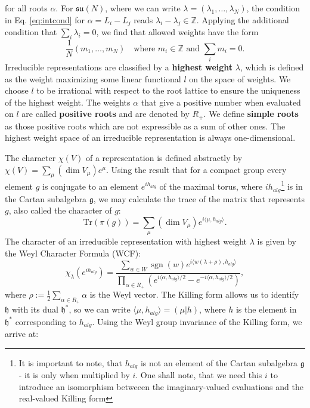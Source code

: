 \documentclass[11pt, a4paper]{article}
\DeclareMathOperator{\sgn}{sgn}
\newcommand{\su}{\mathfrak{su}}
\theoremstyle{definition}
\theoremstyle{remark}
\begin{document}
for all roots $\alpha$. For $\su(N)$, where we can write $\lambda=(\lambda_1, \dots, \lambda_N)$, the condition in Eq. \eqref{eq:intcond} for $\alpha=L_i-L_j$ reads $\lambda_i - \lambda_j \in \mathbb{Z}$. Applying the additional condition that $\sum_i \lambda_i = 0$, we find that allowed weights have the form
\[
\frac{1}{N}(m_1, \dots, m_N) \quad \text{where } m_i \in \mathbb{Z} \text{ and } \sum_i m_i = 0.
\]
Irreducible representations are classified by a \textbf{highest weight} $\lambda$, which is defined as the weight maximizing some linear functional $l$ on the space of weights. We choose $l$ to be irrational with respect to the root lattice to ensure the uniqueness of the highest weight. The weights $\alpha$ that give a positive number when evaluated on $l$ are called \textbf{positive roots} and are denoted by $R_+$. We define \textbf{simple roots} as those positive roots which are not expressible as a sum of other ones. The highest weight space of an irreducible representation is always one-dimensional.

The character $\chi(V)$ of a representation is defined abstractly by $\chi(V) = \sum_\mu (\dim V_\mu)e^\mu$. Using the result that for a compact group every element $g$ is conjugate to an element $e^{ih_{alg}}$ of the maximal torus, where $i h_{alg}$\footnote{It is important to note, that $h_{alg}$ is not an element of the Cartan subalgebra $\mathfrak{g}$ - it is only when multiplied by $i$. One shall note, that we need this $i$ to introduce an isomorphism betweeen the imaginary-valued evaluations and the real-valued Killing form} is in the Cartan subalgebra $\mathfrak{g}$, we may calculate the trace of the matrix that represents $g$, also called the character of $g$:
\[
\mathrm{Tr}(\pi(g)) = \sum_\mu (\dim V_\mu)e^{i\langle \mu, h_{alg} \rangle}.
\]
The character of an irreducible representation with highest weight $\lambda$ is given by the Weyl Character Formula (WCF):
\begin{equation}
    \chi_\lambda(e^{ih_{alg}}) = \frac{\sum_{w \in W} \sgn(w) e^{i\langle w(\lambda + \rho),h_{alg} \rangle}}{\prod_{\alpha \in R_+} (e^{i\langle\alpha,h_{alg}\rangle/2} - e^{-i\langle\alpha,h_{alg}\rangle/2})},
\end{equation}
where $\rho := \frac{1}{2}\sum_{\alpha \in R_+} \alpha$ is the Weyl vector. The Killing form allows us to identify $\mathfrak{h}$ with its dual $\mathfrak{h}^*$, so we can write $\langle \mu, h_{alg} \rangle = (\mu|h)$, where $h$ is the element in $\mathfrak{h}^*$ corresponding to $h_{alg}$. Using the Weyl group invariance of the Killing form, we arrive at:
\end{document}
